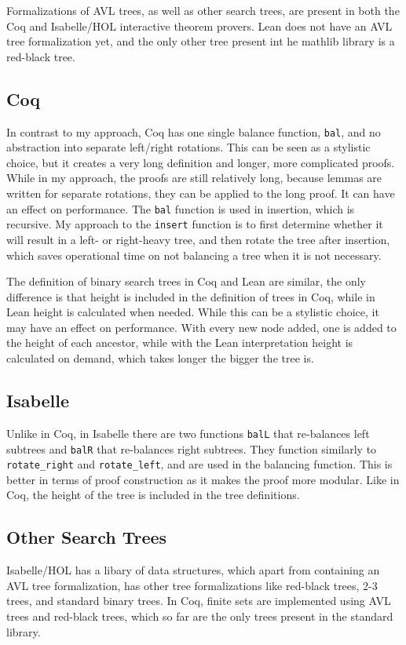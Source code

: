 Formalizations of AVL trees, as well as other search trees, are present in both the Coq \cite{code:coq} and Isabelle/HOL \cite{isabelle} interactive theorem provers. Lean does not have an AVL tree formalization yet, and the only other tree present int he mathlib library is a red-black tree. 

\subsection*{Coq}
In contrast to my approach, Coq has one single balance function, \lstinline{bal}, and no abstraction into separate left/right rotations. This can be seen as a stylistic choice, but it creates a very long definition and longer, more complicated proofs. While in my approach, the proofs are still relatively long, because lemmas are written for separate rotations, they can be applied to the long proof. It can have an effect on performance. The \lstinline{bal} function is used in insertion, which is recursive. My approach to the \lstinline{insert} function is to first determine whether it will result in a left- or right-heavy tree, and then rotate the tree after insertion, which saves operational time on not balancing a tree when it is not necessary.  

The definition of binary search trees in Coq and Lean are similar, the only difference is that height is included in the definition of trees in Coq, while in Lean height is calculated when needed. While this can be a stylistic choice, it may have an effect on performance. With every new node added, one is added to the height of each ancestor, while with the Lean interpretation height is calculated on demand, which takes longer the bigger the tree is.

\subsection*{Isabelle}
Unlike in Coq, in Isabelle there are two functions \lstinline{balL} that re-balances left subtrees and \lstinline{balR} that re-balances right subtrees. They function similarly to \lstinline{rotate_right} and \lstinline{rotate_left}, and are used in the balancing function. This is better in terms of proof construction as it makes the proof more modular. Like in Coq, the height of the tree is included in the tree definitions.

\subsection*{Other Search Trees}
Isabelle/HOL has a libary of data structures, which apart from containing an AVL tree formalization, has other tree formalizations like red-black trees, 2-3 trees, and standard binary trees. In Coq, finite sets are implemented using AVL trees and red-black trees, which so far are the only trees present in the standard library.

